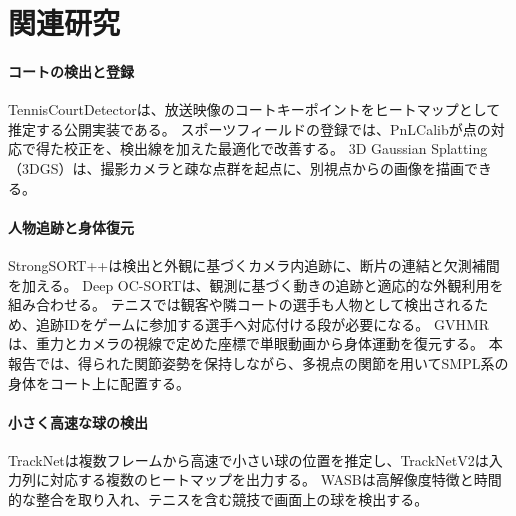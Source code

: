 \section{関連研究}
\label{sec:related-work}

\paragraph{コートの検出と登録}
TennisCourtDetectorは、放送映像のコートキーポイントをヒートマップとして推定する公開実装である\cite{tcd}。
スポーツフィールドの登録では、PnLCalibが点の対応で得た校正を、検出線を加えた最適化で改善する\cite{pnlcalib}。
3D Gaussian Splatting（3DGS）は、撮影カメラと疎な点群を起点に、別視点からの画像を描画できる\cite{gs}。

\paragraph{人物追跡と身体復元}
StrongSORT++は検出と外観に基づくカメラ内追跡に、断片の連結と欠測補間を加える\cite{strongsort}。
Deep OC-SORTは、観測に基づく動きの追跡と適応的な外観利用を組み合わせる\cite{deepocsort}。
テニスでは観客や隣コートの選手も人物として検出されるため、追跡IDをゲームに参加する選手へ対応付ける段が必要になる。
GVHMRは、重力とカメラの視線で定めた座標で単眼動画から身体運動を復元する\cite{gvhmr}。
本報告では、得られた関節姿勢を保持しながら、多視点の関節を用いてSMPL系の身体\cite{smpl}をコート上に配置する。

\paragraph{小さく高速な球の検出}
TrackNetは複数フレームから高速で小さい球の位置を推定し、TrackNetV2は入力列に対応する複数のヒートマップを出力する\cite{tracknet,tracknetv2}。
WASBは高解像度特徴と時間的な整合を取り入れ、テニスを含む競技で画面上の球を検出する\cite{wasb}。
